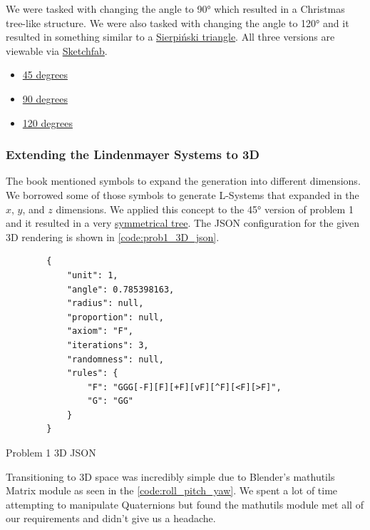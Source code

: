 We were tasked with changing the angle to 90° which resulted in a
Christmas tree-like structure. We were also tasked with changing the angle to
120° and it resulted in something similar to a
\href{https://en.wikipedia.org/wiki/Sierpi\%C5\%84ski\_triangle}{Sierpiński triangle}.
All three versions are viewable via
\href{https://sketchfab.com/macattackftw/collections/problem-1}{Sketchfab}.

\begin{itemize}
    \item \href{https://sketchfab.com/3d-models/prob1-45-a97f7475b6964b9c930796ba985ac255}{45 degrees}
    \item \href{https://sketchfab.com/3d-models/8c7a25615cee4fb4a51ab3deeae154a0}{90 degrees}
    \item \href{https://sketchfab.com/3d-models/b36c6e912ee548b9a549bd8e0bb273c8}{120 degrees}
\end{itemize}


\subsubsection{Extending the Lindenmayer Systems to 3D}
The book mentioned symbols to expand the generation into different dimensions.
We borrowed some of those symbols to generate L-Systems that expanded in the
$x$, $y$, and $z$ dimensions. We applied this
concept to the 45° version of problem 1 and it resulted in a very
\href{https://sketchfab.com/3d-models/prob1-3d-236e501897a945d0a3eb5e4cba37fa3a}{symmetrical tree}.
The JSON configuration for the given 3D rendering is shown in \autoref{code:prob1_3D_json}.

\begin{listing}[H]
    \begin{verbatim}
        {
            "unit": 1,
            "angle": 0.785398163,
            "radius": null,
            "proportion": null,
            "axiom": "F",
            "iterations": 3,
            "randomness": null,
            "rules": {
                "F": "GGG[-F][F][+F][vF][^F][<F][>F]",
                "G": "GG"
            }
        }
    \end{verbatim}
    \caption{Problem 1 3D JSON}\label{code:prob1_3D_json}
\end{listing}

Transitioning to 3D space was incredibly simple due to Blender's mathutils
Matrix module as seen in the
\autoref{code:roll_pitch_yaw}. We spent a lot of
time attempting to manipulate Quaternions but found the mathutils module met
all of our requirements and didn't give us a headache.

